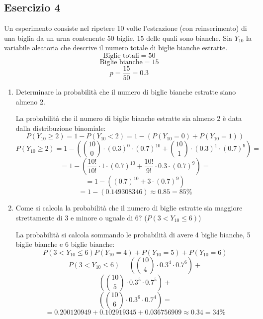\documentclass[a4paper]{article}
\theoremstyle{break}
\theoremstyle{break}
\theoremstyle{break}
\theoremstyle{break}
\begin{document}
\subsection{Esercizio 4}
Un esperimento consiste nel ripetere 10 volte l'estrazione (con reinserimento) di una
biglia da un urna contenente 50 biglie, 15 delle quali sono bianche. Sia \( Y_{10} \) la
variabile aleatoria che descrive il numero totale di biglie bianche estratte.
\[
	\text{Biglie totali} = 50
\]
\[
	\text{Biglie bianche} = 15
\]
\[
	p = \frac{15}{50} = 0.3
\]
\begin{enumerate}
	\item Determinare la probabilità che il numero di biglie bianche estratte siano almeno 2.

	      \vspace{1em}
	      La probabilità che il numero di biglie bianche estratte sia almeno 2 è data dalla
	      distribuzione binomiale:
	      \[
		      P(Y_{10} \ge 2) = 1 - P(Y_{10} < 2) = 1 - (P(Y_{10} = 0) + P(Y_{10} = 1))
	      \]
	      \[
		      P(Y_{10} \ge 2) = 1 - \left(\binom{10}{0} \cdot \left( 0.3 \right)^0
		      \cdot \left( 0.7 \right)^{10} + \binom{10}{1} \cdot
		      \left( 0.3 \right)^1 \cdot \left( 0.7 \right)^9\right) =
	      \]
	      \[
		      = 1 - \left( \frac{10!}{10!} \cdot 1 \cdot \left(0.7\right)^{10} +
		      \frac{10!}{9!} \cdot 0.3 \cdot \left( 0.7 \right)^9 \right)  =
	      \]
	      \[
		      = 1 - \left( \left( 0.7 \right)^{10} + 3 \cdot \left( 0.7 \right)^9 \right)
	      \]
	      \[
		      = 1 - \left( 0.149308346 \right) \approx 0.85 = 85\%
	      \]
	\item Come si calcola la probabilità che il numero di biglie estratte sia maggiore
	      strettamente di 3 e minore o uguale di 6? (\( P(3 < Y_{10} \le 6) \))

	      \vspace{1em}
	      La probabilità si calcola sommando le probabilità di avere 4 biglie
	      bianche, 5 biglie bianche e 6 biglie bianche:
	      \[
		      P(3 < Y_{10} \le 6) P(Y_{10} = 4) + P(Y_{10} = 5) + P(Y_{10} = 6)
	      \]
	      \[
		      P(3 < Y_{10} \le 6) = \left( \binom{10}{4} \cdot 0.3^4 \cdot 0.7^6 \right) +
	      \]
	      \[
		      \left( \binom{10}{5} \cdot 0.3^5 \cdot 0.7^5 \right) +
	      \]
	      \[
		      \left( \binom{10}{6} \cdot 0.3^6 \cdot 0.7^4 \right) =
	      \]
	      \[
		      = 0.200120949 + 0.102919345 + 0.036756909 \approx 0.34 = 34\%
	      \]
\end{enumerate}
\end{document}
